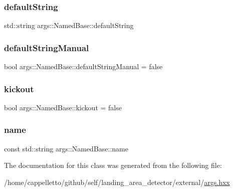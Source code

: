 \subsubsection{\texorpdfstring{default\+String}{defaultString}}
{\footnotesize\ttfamily std\+::string args\+::\+Named\+Base\+::default\+String\hspace{0.3cm}{\ttfamily [protected]}}

\mbox{\label{classargs_1_1_named_base_a2bfe3539152114a52a4a8089920eea59}} 
\subsubsection{\texorpdfstring{default\+String\+Manual}{defaultStringManual}}
{\footnotesize\ttfamily bool args\+::\+Named\+Base\+::default\+String\+Manual = false\hspace{0.3cm}{\ttfamily [protected]}}

\mbox{\label{classargs_1_1_named_base_a034ad347cb530cbf9e0e9ce1b67a66ba}} 
\subsubsection{\texorpdfstring{kickout}{kickout}}
{\footnotesize\ttfamily bool args\+::\+Named\+Base\+::kickout = false\hspace{0.3cm}{\ttfamily [protected]}}

\mbox{\label{classargs_1_1_named_base_a774cbec5dc864c48e84051c044cefa77}} 
\subsubsection{\texorpdfstring{name}{name}}
{\footnotesize\ttfamily const std\+::string args\+::\+Named\+Base\+::name\hspace{0.3cm}{\ttfamily [protected]}}



The documentation for this class was generated from the following file\+:\begin{DoxyCompactItemize}
\item 
/home/cappelletto/github/self/landing\+\_\+area\+\_\+detector/external/\hyperlink{args_8hxx}{args.\+hxx}\end{DoxyCompactItemize}
